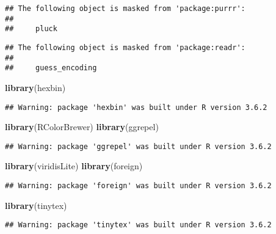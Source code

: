 \documentclass[]{article}
\newenvironment{Shaded}{\begin{snugshade}}{\end{snugshade}}
\newcommand{\KeywordTok}[1]{\textcolor[rgb]{0.13,0.29,0.53}{\textbf{#1}}}
\newcommand{\NormalTok}[1]{#1}
\begin{document}
\begin{verbatim}
## The following object is masked from 'package:purrr':
## 
##     pluck
\end{verbatim}

\begin{verbatim}
## The following object is masked from 'package:readr':
## 
##     guess_encoding
\end{verbatim}

\begin{Shaded}
\begin{Highlighting}[]
\KeywordTok{library}\NormalTok{(hexbin)}
\end{Highlighting}
\end{Shaded}

\begin{verbatim}
## Warning: package 'hexbin' was built under R version 3.6.2
\end{verbatim}

\begin{Shaded}
\begin{Highlighting}[]
\KeywordTok{library}\NormalTok{(RColorBrewer)}
\KeywordTok{library}\NormalTok{(ggrepel)}
\end{Highlighting}
\end{Shaded}

\begin{verbatim}
## Warning: package 'ggrepel' was built under R version 3.6.2
\end{verbatim}

\begin{Shaded}
\begin{Highlighting}[]
\KeywordTok{library}\NormalTok{(viridisLite)}
\KeywordTok{library}\NormalTok{(foreign)}
\end{Highlighting}
\end{Shaded}

\begin{verbatim}
## Warning: package 'foreign' was built under R version 3.6.2
\end{verbatim}

\begin{Shaded}
\begin{Highlighting}[]
\KeywordTok{library}\NormalTok{(tinytex)}
\end{Highlighting}
\end{Shaded}

\begin{verbatim}
## Warning: package 'tinytex' was built under R version 3.6.2
\end{verbatim}
\end{document}
